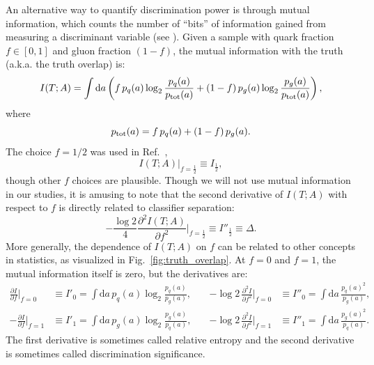 \documentclass[11pt,letterpaper]{article}
\newcommand{\df}{\text{d}}
\DeclareRobustCommand{\Fig}[1]{Fig.~\ref{#1}}
\DeclareRobustCommand{\Ref}[1]{Ref.~\cite{#1}}
\newcommand{\be}{\begin{equation}}
\newcommand{\ee}{\end{equation}}
\begin{document}

An alternative way to quantify discrimination power is through mutual information, which counts the number of ``bits'' of information gained from measuring a discriminant variable (see \cite{Larkoski:2014pca}).  Given a sample with quark fraction $f \in [0,1]$ and gluon fraction $(1-f)$, the mutual information with the truth (a.k.a. the truth overlap) is:
\be
I(T;A) = \int \df a \left(f \, p_q(a) \log_2 \frac{p_q(a)}{p_{\rm tot}(a)} + (1-f) \, p_g(a) \log_2 \frac{p_g(a)}{p_{\rm tot}(a)}   \right),
\ee
where
\be
p_{\rm tot}(a) = f \, p_q(a) + (1-f) \, p_g(a).
\ee
The choice $f = 1/2$ was used in \Ref{Larkoski:2014pca},
\be
I(T;A)\big|_{f = \frac{1}{2}} \equiv I_{\frac{1}{2}},
\ee though other $f$ choices are plausible.  Though we will not use mutual information in our studies, it is amusing to note that the second derivative of $I(T;A)$ with respect to $f$ is directly related to classifier separation:
\be
\label{eq:altdeltadef}
- \frac{\log 2}{4} \frac{\partial^2 I(T;A)}{\partial f^2} \Big|_{f = \frac{1}{2}} \equiv I''_\frac{1}{2} \equiv \Delta.
\ee
More generally, the dependence of $I(T;A)$ on $f$ can be related to other concepts in statistics, as visualized in \Fig{fig:truth_overlap}.  At $f = 0$ and $f = 1$, the mutual information itself is zero, but the derivatives are:
\begin{align}
\frac{\partial I}{\partial f} \Big|_{f = 0} &\equiv I'_0 = \int \df a \, p_q(a)  \log_2 \frac{p_q(a)}{p_g(a)}, \quad &- \log 2 \,  \frac{\partial^2 I}{\partial f^2} \Big|_{f = 0} &\equiv I''_0 = \int \df a \,  \frac{p_q(a)^2}{p_g(a)},\\
- \frac{\partial I}{\partial f} \Big|_{f = 1} &\equiv I'_1 = \int \df a \, p_g(a) \log_2 \frac{p_g(a)}{p_q(a)}, \quad &- \log 2 \, \frac{\partial^2 I}{\partial f^2} \Big|_{f = 1} &\equiv I''_1 = \int \df a \, \frac{p_g(a)^2}{p_q(a)}.
\end{align}
The first derivative is sometimes called relative entropy and the second derivative is sometimes called discrimination significance.  

\end{document}
